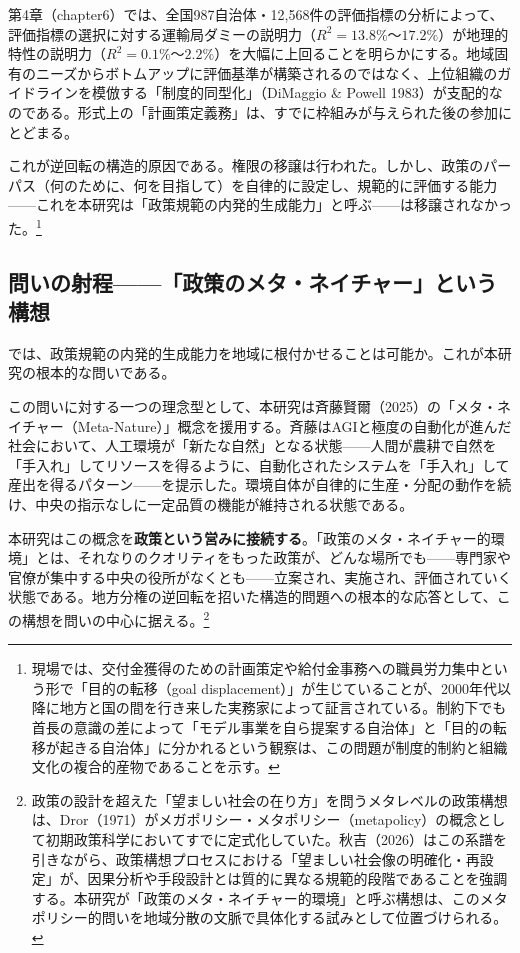 第4章（chapter6）では、全国987自治体・12,568件の評価指標の分析によって、評価指標の選択に対する運輸局ダミーの説明力（$R^2 = 13.8\%$〜$17.2\%$）が地理的特性の説明力（$R^2 = 0.1\%$〜$2.2\%$）を大幅に上回ることを明らかにする。地域固有のニーズからボトムアップに評価基準が構築されるのではなく、上位組織のガイドラインを模倣する「制度的同型化」（DiMaggio \& Powell 1983）が支配的なのである。形式上の「計画策定義務」は、すでに枠組みが与えられた後の参加にとどまる。

これが逆回転の構造的原因である。権限の移譲は行われた。しかし、政策のパーパス（何のために、何を目指して）を自律的に設定し、規範的に評価する能力——これを本研究は「政策規範の内発的生成能力」と呼ぶ——は移譲されなかった。\footnote{現場では、交付金獲得のための計画策定や給付金事務への職員労力集中という形で「目的の転移（goal displacement）」が生じていることが、2000年代以降に地方と国の間を行き来した実務家によって証言されている\cite{yaguchi2026}。制約下でも首長の意識の差によって「モデル事業を自ら提案する自治体」と「目的の転移が起きる自治体」に分かれるという観察は、この問題が制度的制約と組織文化の複合的産物であることを示す。}

\subsection{問いの射程——「政策のメタ・ネイチャー」という構想}
\label{subsec:intro_metanature}

では、政策規範の内発的生成能力を地域に根付かせることは可能か。これが本研究の根本的な問いである。

この問いに対する一つの理念型として、本研究は斉藤賢爾（2025）の「メタ・ネイチャー（Meta-Nature）」概念を援用する\cite{saito2025metanature}。斉藤はAGIと極度の自動化が進んだ社会において、人工環境が「新たな自然」となる状態——人間が農耕で自然を「手入れ」してリソースを得るように、自動化されたシステムを「手入れ」して産出を得るパターン——を提示した。環境自体が自律的に生産・分配の動作を続け、中央の指示なしに一定品質の機能が維持される状態である。

本研究はこの概念を\textbf{政策という営みに接続する}。「政策のメタ・ネイチャー的環境」とは、それなりのクオリティをもった政策が、どんな場所でも——専門家や官僚が集中する中央の役所がなくとも——立案され、実施され、評価されていく状態である。地方分権の逆回転を招いた構造的問題への根本的な応答として、この構想を問いの中心に据える。\footnote{政策の設計を超えた「望ましい社会の在り方」を問うメタレベルの政策構想は、Dror（1971）がメガポリシー・メタポリシー（metapolicy）の概念として初期政策科学においてすでに定式化していた\cite{dror1971}。秋吉（2026）はこの系譜を引きながら、政策構想プロセスにおける「望ましい社会像の明確化・再設定」が、因果分析や手段設計とは質的に異なる規範的段階であることを強調する\cite{akiyoshi2026}。本研究が「政策のメタ・ネイチャー的環境」と呼ぶ構想は、このメタポリシー的問いを地域分散の文脈で具体化する試みとして位置づけられる。}

